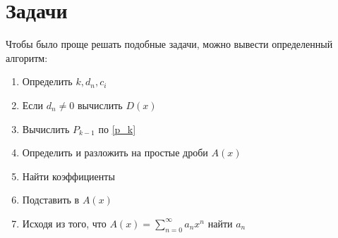 \section{Задачи}
Чтобы было проще решать подобные задачи, можно вывести определенный алгоритм:
\begin{enumerate}
    \item Определить $k, d_n, c_i$
    \item Если $d_n \neq 0$ вычислить $D(x)$
    \item Вычислить $P_{k-1}$ по \ref{p_k}
    \item Определить и разложить на простые дроби $A(x)$
    \item Найти коэффициенты
    \item Подставить в $A(x)$
    \item Исходя из того, что $A(x) = \sum_{n = 0}^{\infty} a_n x^n$ найти $a_n$
\end{enumerate}
